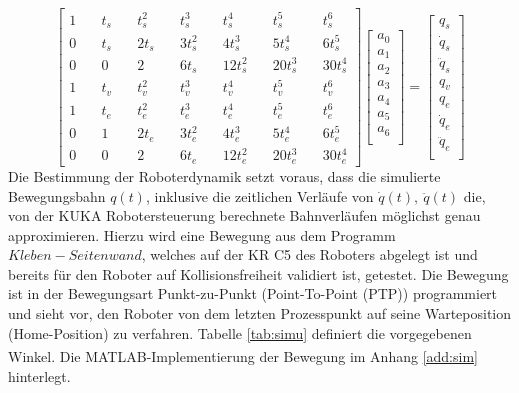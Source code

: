 \begin{equation}
	\label{eqn:lgs}
	\left[	\begin{matrix}
		1&\quad    t_s&\quad          	t_s^2&\quad              	t_s^3&\quad         	t_s^4&\quad              	t_s^5&\quad          	t_s^6\\
		0&\quad    t_s&\quad          	2t_s&\quad              	3t_s^2&\quad        	4t_s^3&\quad            	5t_s^4&\quad        	6t_s^5\\
		0&\quad    0&\quad         		2&\quad              	  	6t_s&\quad         	 	12t_s^2&\quad           	20t_s^3&\quad       	30t_s^4\\
		1&\quad    t_v&\quad         	t_v^2&\quad              	t_v^3&\quad         	t_v^4&\quad             	t_v^5&\quad          	t_v^6\\
		1&\quad    t_e&\quad        	t_e^2&\quad              	t_e^3&\quad          	t_e^4&\quad             	t_e^5&\quad          	t_e^6\\
		0&\quad    1&\quad   	   		2t_e&\quad              	3t_e^2&\quad        	4t_e^3&\quad           		5t_e^4&\quad        	6t_e^5\\   
		0&\quad    0&\quad          	2&\quad                 	6t_e&\quad          	12t_e^2&\quad           	20t_e^3&\quad       	30t_e^4
	\end{matrix}\right]
	\left[	\begin{matrix}
		a_0\\
		a_1\\
		a_2\\
		a_3\\
		a_4\\
		a_5\\
		a_6\\		
	\end{matrix}\right] = 
		\left[	\begin{matrix}
		q_s\\
		\dot{q}_s\\
		\ddot{q}_s\\
		q_v\\
		q_e\\
		\dot{q}_e\\
		\ddot{q}_e\\		
	\end{matrix}\right]
\end{equation}
%
Die Bestimmung der Roboterdynamik setzt voraus, dass die simulierte Bewegungsbahn $q(t)$, inklusive die zeitlichen Verläufe von $\dot{q}(t), ~\ddot{q}(t)$  die, von der KUKA Robotersteuerung berechnete Bahnverläufen möglichst genau approximieren. Hierzu wird eine Bewegung aus dem Programm $Kleben-Seitenwand$, welches auf der KR C5 des Roboters abgelegt ist und bereits für den Roboter auf Kollisionsfreiheit validiert ist, getestet. Die Bewegung ist in der Bewegungsart  Punkt-zu-Punkt (Point-To-Point (PTP)) programmiert und sieht vor, den Roboter von dem letzten Prozesspunkt auf seine Warteposition (Home-Position) zu verfahren. Tabelle \ref{tab:simu} definiert die vorgegebenen Winkel. Die MATLAB\textsuperscript{\textregistered}-Implementierung der Bewegung im Anhang \ref{add:sim} hinterlegt.
